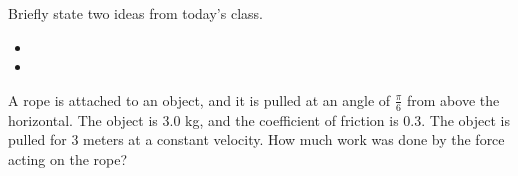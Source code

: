 \postClass

\begin{problem}
\item Briefly state two ideas from today's class.
  \begin{itemize}
  \item 
  \item 
  \end{itemize}
\item 
  \begin{subproblem}
    \item
  \end{subproblem}
\end{problem}



\begin{problem}
\item A rope is attached to an object, and it is pulled at an angle of
  $\frac{\pi}{6}$ from above the horizontal. The object is 3.0 kg, and
  the coefficient of friction is 0.3. The object is pulled for 3
  meters at a constant velocity. How much work was done by the force
  acting on the rope?

  \vfill
\end{problem}



